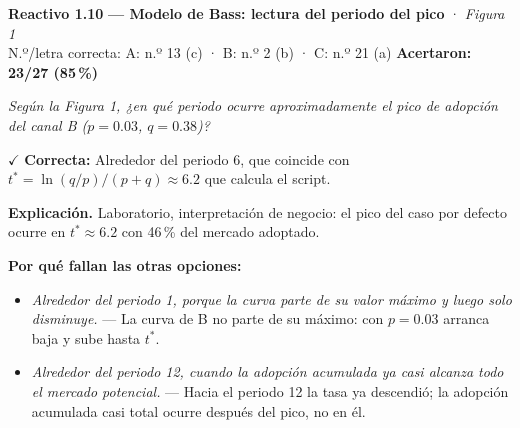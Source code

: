 \documentclass[10pt,letterpaper]{article}
\begin{document}
\begin{minipage}{\textwidth}
{\color{guinda}\textbf{Reactivo 1.10}} \textbf{— Modelo de Bass: lectura del periodo del pico} · \textit{Figura 1}\\[-1pt]
{\scriptsize N.º/letra correcta: A: n.º 13 (c) · B: n.º 2 (b) · C: n.º 21 (a) \hfill \textbf{Acertaron: 23/27 (85\,\%)}}

\textit{Según la Figura 1, ¿en qué periodo ocurre aproximadamente el pico de adopción del canal B ($p=0.03$, $q=0.38$)?}

\textcolor{verde}{$\checkmark$} \textbf{Correcta:} Alrededor del periodo 6, que coincide con $t^\ast=\ln(q/p)/(p+q)\approx 6.2$ que calcula el script.

\textbf{Explicación.} Laboratorio, interpretación de negocio: el pico del caso por defecto ocurre en $t^\ast\approx6.2$ con 46\,\% del mercado adoptado.

\textbf{Por qué fallan las otras opciones:}
\begin{itemize}[itemsep=0pt,topsep=1pt,leftmargin=1.3em,parsep=0pt]
\item[\textcolor{rojo}{$\times$}] \textit{Alrededor del periodo 1, porque la curva parte de su valor máximo y luego solo disminuye.} --- La curva de B no parte de su máximo: con $p=0.03$ arranca baja y sube hasta $t^\ast$.
\item[\textcolor{rojo}{$\times$}] \textit{Alrededor del periodo 12, cuando la adopción acumulada ya casi alcanza todo el mercado potencial.} --- Hacia el periodo 12 la tasa ya descendió; la adopción acumulada casi total ocurre después del pico, no en él.
\end{itemize}
\end{minipage}\par\vspace{5pt}{\color{gray!40}\hrule}\vspace{5pt}
\end{document}
